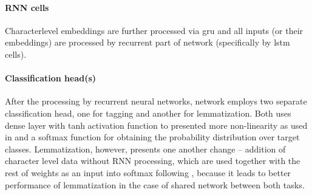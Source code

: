 \paragraph{RNN cells}
Characterlevel embeddings are further processed via \acrfull{gru} and all inputs (or their embeddings) are processed by recurrent part of network (specifically by \acrfull{lstm} cells).

\paragraph{Classification head(s)}
After the processing by recurrent neural networks, network employs two separate classification head, one for tagging and another for lemmatization. Both uses dense layer with tanh activation function to presented more non-linearity as used in \citep{2018} and a softmax function for obtaining the probability distribution over target classes. Lemmatization, however, presents one another change -- addition of character level data without RNN processing, which are used together with the rest of weights as an input into softmax following \citep{Straka2018}, because it leads to better performance of lemmatization in the case of shared network between both tasks.

